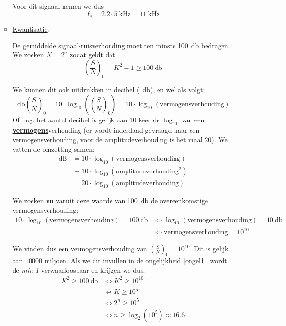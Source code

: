 \documentclass{kuburgiearticle}
\begin{document}
\begin{enumerate}
\begin{itemize}
			Voor dit signaal nemen we dus \[ f_s = 2.2\cdot \SI{5}{\kilo\hertz}=\boxed{\SI{11}{\kilo\hertz}} \]
			\item \underline{Kwantisatie}:

			De gemiddelde signaal-ruisverhouding moet ten minste \SI{100}{\decibel} bedragen. We zoeken \(K=2^n\) zodat geldt dat
			\begin{equation}
				\left(\frac{S}{N}\right)_0=K^2-1\geq \SI{100}{\decibel} \label{ongel1}
			\end{equation}

			We kunnen dit ook uitdrukken in decibel (\SI{}{\decibel}), en wel als volgt: \[\SI{}{\decibel}\left(\frac{S}{N}\right)_0 = 10\cdot \log_{10}\left(\left(\frac{S}{N}\right)_0\right) = 10 \cdot \log_{10}(\text{vermogensverhouding})\] Of nog: het aantal decibel is gelijk aan 10 keer de \( \log_{10} \) van een \underline{\textbf{vermogens}}verhouding (er wordt inderdaad gevraagd naar een vermogensverhouding, voor de amplitudeverhouding is het maal 20). We vatten de omzetting samen:
			\begin{equation*}
				\begin{split}
					\text{dB} &= 10 \cdot \log_{10}(\text{vermogensverhouding}) \\
					&= 10 \cdot \log_{10}(\text{amplitudeverhouding}^2) \\
					&= 20 \cdot \log_{10}(\text{amplitudeverhouding})
				\end{split}
			\end{equation*}

			We zoeken nu vanuit deze waarde van \SI{100}{\decibel} de overeenkomstige vermogensverhouding:
			\begin{equation*}
				\begin{split}
					10 \cdot \log_{10}(\text{vermogensverhouding}) = \SI{100}{\decibel} &\Leftrightarrow \log_{10}(\text{vermogensverhouding}) = \SI{10}{\decibel} \\
					& \Leftrightarrow \text{vermogensverhouding} = 10^{10}
				\end{split}
			\end{equation*}

			We vinden dus een vermogensverhouding van \( \left(\frac{S}{N}\right)_0 = 10^{10} \). Dit is gelijk aan \( 10000 \) miljoen. Als we dit invullen in de ongelijkheid \ref{ongel1}, wordt de \textit{min 1} verwaarloosbaar en krijgen we dus:
			\begin{equation*}
				\begin{split}
					K^2\geq \SI{100}{\decibel} &\Leftrightarrow K^2 \geq 10^{10} \\
					& \Leftrightarrow K \geq 10^5 \\
					& \Leftrightarrow 2^n \geq 10^5 \\
					& \Leftrightarrow n \geq \log_2(10^5)\approx 16.6
				\end{split}
			\end{equation*}


\end{itemize}
\end{enumerate}
\end{document}

